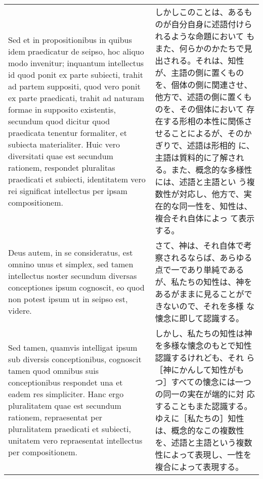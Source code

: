 \documentclass[10pt]{jsarticle}
\begin{document}
\begin{longtable}{p{21em}p{21em}}
\\

Sed et in propositionibus in quibus idem praedicatur de seipso, hoc
aliquo modo invenitur; inquantum intellectus id quod ponit ex parte
subiecti, trahit ad partem suppositi, quod vero ponit ex parte
praedicati, trahit ad naturam formae in supposito existentis, secundum
quod dicitur quod praedicata tenentur formaliter, et subiecta
materialiter. Huic vero diversitati quae est secundum rationem,
respondet pluralitas praedicati et subiecti, identitatem vero rei
significat intellectus per ipsam compositionem.

&

しかしこのことは、あるものが自分自身に述語付けられるような命題において
もまた、何らかのかたちで見出される。それは、知性が、主語の側に置くもの
を、個体の側に関連させ、他方で、述語の側に置くものを、その個体において
存在する形相の本性に関係させることによるが、そのかぎりで、述語は形相的
に、主語は質料的に了解される。また、概念的な多様性には、述語と主語とい
う複数性が対応し、他方で、実在的な同一性を、知性は、複合それ自体によっ
て表示する。

\\

Deus autem, in se consideratus, est omnino unus et simplex, sed tamen
intellectus noster secundum diversas conceptiones ipsum cognoscit, eo
quod non potest ipsum ut in seipso est, videre.

&

さて、神は、それ自体で考察されるならば、あらゆる点で一であり単純である
が、私たちの知性は、神をあるがままに見ることができないので、それを多様
な懐念に即して認識する。

\\

Sed tamen, quamvis intelligat ipsum sub diversis conceptionibus,
cognoscit tamen quod omnibus suis conceptionibus respondet una et
eadem res simpliciter. Hanc ergo pluralitatem quae est secundum
rationem, repraesentat per pluralitatem praedicati et subiecti,
unitatem vero repraesentat intellectus per compositionem.

&

しかし、私たちの知性は神を多様な懐念のもとで知性認識するけれども、それ
ら［神にかんして知性がもつ］すべての懐念には一つの同一の実在が端的に対
応することもまた認識する。ゆえに［私たちの］知性は、概念的なこの複数性
を、述語と主語という複数性によって表現し、一性を複合によって表現する。

\\


\end{longtable}
\end{document}
